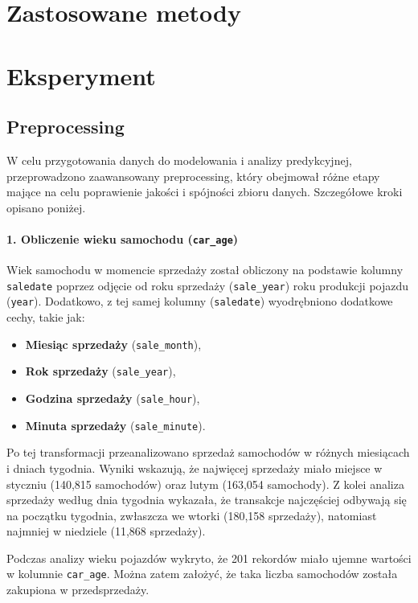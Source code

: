 \documentclass[10pt,letterpaper]{article}
\begin{document}
\section{Zastosowane metody}
\section{Eksperyment}
\subsection{Preprocessing}

W celu przygotowania danych do modelowania i analizy predykcyjnej, przeprowadzono zaawansowany preprocessing, który obejmował różne etapy mające na celu poprawienie jakości i spójności zbioru danych. Szczegółowe kroki opisano poniżej.

\paragraph{1. Obliczenie wieku samochodu (\texttt{car\_age})}
Wiek samochodu w momencie sprzedaży został obliczony na podstawie kolumny \texttt{saledate} poprzez odjęcie od roku sprzedaży (\texttt{sale\_year}) roku produkcji pojazdu (\texttt{year}). Dodatkowo, z tej samej kolumny (\texttt{saledate}) wyodrębniono dodatkowe cechy, takie jak:
\begin{itemize}
    \item \textbf{Miesiąc sprzedaży} (\texttt{sale\_month}),
    \item \textbf{Rok sprzedaży} (\texttt{sale\_year}),
    \item \textbf{Godzina sprzedaży} (\texttt{sale\_hour}),
    \item \textbf{Minuta sprzedaży} (\texttt{sale\_minute}).
\end{itemize}

Po tej transformacji przeanalizowano sprzedaż samochodów w różnych miesiącach i dniach tygodnia. Wyniki wskazują, że najwięcej sprzedaży miało miejsce w styczniu (140,815 samochodów) oraz lutym (163,054 samochody). Z kolei analiza sprzedaży według dnia tygodnia wykazała, że transakcje najczęściej odbywają się na początku tygodnia, zwłaszcza we wtorki (180,158 sprzedaży), natomiast najmniej w niedziele (11,868 sprzedaży).

Podczas analizy wieku pojazdów wykryto, że 201 rekordów miało ujemne wartości w kolumnie \texttt{car\_age}. Można zatem założyć, że taka liczba samochodów została zakupiona w przedsprzedaży.
\end{document}
